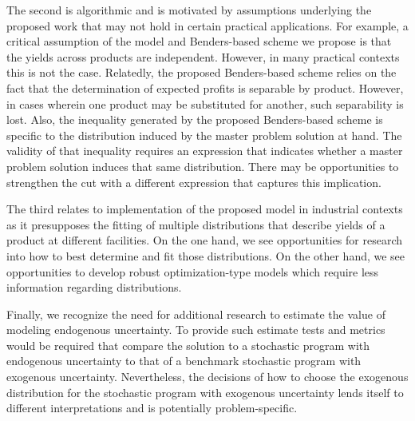 \documentclass[12pt]{article}
\theoremstyle{thmstylethree}%
\begin{document}
The second is algorithmic and is motivated by assumptions underlying the proposed work that may not hold in certain practical applications. For example, a critical assumption of the model and Benders-based scheme we propose is that the yields across products are independent. However, in many practical contexts this is not the case. Relatedly, the proposed Benders-based scheme relies on the fact that the determination of expected profits is separable by product. However, in cases wherein one product may be substituted for another, such separability is lost. Also, the inequality generated by the proposed Benders-based scheme is specific to the distribution induced by the master problem solution at hand. The validity of that inequality requires an expression that indicates whether a master problem solution induces that same distribution. There may be opportunities to strengthen the cut with a different expression that captures this implication.

The third relates to implementation of the proposed model in industrial contexts as it presupposes the fitting of multiple distributions that describe yields of a product at different facilities. On the one hand, we see opportunities for research into how to best determine and fit those distributions. On the other hand, we see opportunities to develop robust optimization-type models which require less information regarding distributions.

Finally, we recognize the need for additional research to estimate the value of modeling endogenous uncertainty. To provide such estimate tests and metrics would be required that compare the solution to a stochastic program with endogenous uncertainty to that of a benchmark stochastic program with exogenous uncertainty. Nevertheless, the decisions
of how to choose the exogenous distribution for the stochastic program with exogenous uncertainty lends itself to different interpretations and is potentially problem-specific. 




\end{document}
